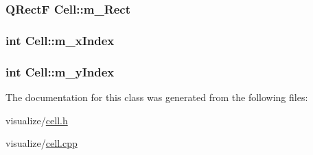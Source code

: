 \label{class_cell_a493878cf970747f1596773aae325fc87}
\hypertarget{class_cell_a870b275658020dc6d2cdc48beadf0b35}{
\subsubsection[{m\_\-Rect}]{\setlength{\rightskip}{0pt plus 5cm}QRectF {\bf Cell::m\_\-Rect}}}
\label{class_cell_a870b275658020dc6d2cdc48beadf0b35}
\hypertarget{class_cell_a6979d1a8ade7f0a6419fcfe4cd2be8b2}{
\subsubsection[{m\_\-xIndex}]{\setlength{\rightskip}{0pt plus 5cm}int {\bf Cell::m\_\-xIndex}}}
\label{class_cell_a6979d1a8ade7f0a6419fcfe4cd2be8b2}
\hypertarget{class_cell_a2307ec9f6194515d2e399a6e16dfc416}{
\subsubsection[{m\_\-yIndex}]{\setlength{\rightskip}{0pt plus 5cm}int {\bf Cell::m\_\-yIndex}}}
\label{class_cell_a2307ec9f6194515d2e399a6e16dfc416}


The documentation for this class was generated from the following files:\begin{DoxyCompactItemize}
\item 
visualize/\hyperlink{cell_8h}{cell.h}\item 
visualize/\hyperlink{cell_8cpp}{cell.cpp}\end{DoxyCompactItemize}
